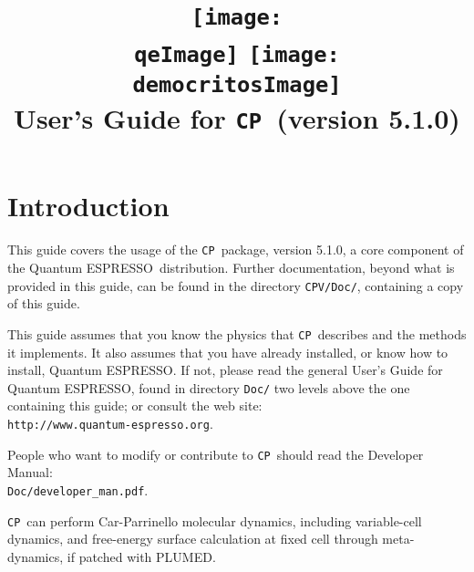 \documentclass[12pt,a4paper]{article}
\def\version{5.1.0}
\def\qe{{\sc Quantum ESPRESSO}}
\def\CP{\texttt{CP}}
\begin{document}
 
\author{}
\date{}

\def\qeImage{../../Doc/quantum_espresso.pdf}
\def\democritosImage{../../Doc/democritos.pdf}

\begin{htmlonly}
\def\qeImage{../../Doc/quantum_espresso.png}
\def\democritosImage{../../Doc/democritos.png}
\end{htmlonly}

\title{
  \texttt{[image: \\qeImage]} \hskip 2cm
  \texttt{[image: \\democritosImage]}\\
  \vskip 1cm
  \Huge User's Guide for \CP\
  \Large (version \version)
}

\maketitle

\tableofcontents

\section{Introduction}

This guide covers the  usage of the
\CP\ package, version \version, a core component 
of the \qe\ distribution.
Further documentation, beyond what is provided 
in this guide, can be found in the directory
\texttt{CPV/Doc/}, containing a copy of this guide.

This guide assumes that you know the physics 
that \CP\ describes and the methods it implements.
It also assumes  that you have already installed,
or know how to install, \qe. If not, please read
the general User's Guide for \qe, found in 
directory \texttt{Doc/} two levels above the 
one containing this guide; or consult the web site:\\
\texttt{http://www.quantum-espresso.org}.

People who want to modify or contribute to 
\CP\ should read the Developer Manual: \\
\texttt{Doc/developer\_man.pdf}.

\CP\ can perform Car-Parrinello molecular dynamics, including
variable-cell dynamics, and free-energy surface calculation at
fixed cell through meta-dynamics, if patched with PLUMED.
\end{document}
